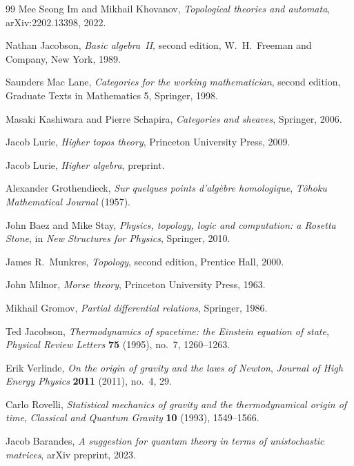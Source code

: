 \documentclass[12pt, a4paper]{article}
\theoremstyle{plain}
\theoremstyle{definition}
\theoremstyle{correspondence}
\begin{document}
\begin{thebibliography}{99}
Mee Seong Im and Mikhail Khovanov,
\textit{Topological theories and automata},
arXiv:2202.13398, 2022.

Nathan Jacobson,
\textit{Basic algebra~II},
second edition,
W.~H.~Freeman and Company, New York, 1989.


Saunders Mac Lane,
\textit{Categories for the working mathematician},
second edition,
Graduate Texts in Mathematics 5,
Springer, 1998.

Masaki Kashiwara and Pierre Schapira,
\textit{Categories and sheaves},
Springer, 2006.

Jacob Lurie,
\textit{Higher topos theory},
Princeton University Press, 2009.

Jacob Lurie,
\textit{Higher algebra},
preprint.

Alexander Grothendieck,
\textit{Sur quelques points d'alg\`ebre homologique},
\textit{T\^{o}hoku Mathematical Journal} (1957).

John Baez and Mike Stay,
\textit{Physics, topology, logic and computation: a Rosetta Stone},
in \textit{New Structures for Physics},
Springer, 2010.

James R.~Munkres,
\textit{Topology},
second edition,
Prentice Hall, 2000.

John Milnor,
\textit{Morse theory},
Princeton University Press, 1963.

Mikhail Gromov,
\textit{Partial differential relations},
Springer, 1986.


Ted Jacobson,
\textit{Thermodynamics of spacetime: the Einstein equation of state},
\textit{Physical Review Letters} \textbf{75} (1995), no.~7, 1260--1263.

Erik Verlinde,
\textit{On the origin of gravity and the laws of Newton},
\textit{Journal of High Energy Physics} \textbf{2011} (2011), no.~4, 29.

Carlo Rovelli,
\textit{Statistical mechanics of gravity and the thermodynamical origin of time},
\textit{Classical and Quantum Gravity} \textbf{10} (1993), 1549--1566.

Jacob Barandes,
\textit{A suggestion for quantum theory in terms of unistochastic matrices},
arXiv preprint, 2023.


\end{thebibliography}
\end{document}
